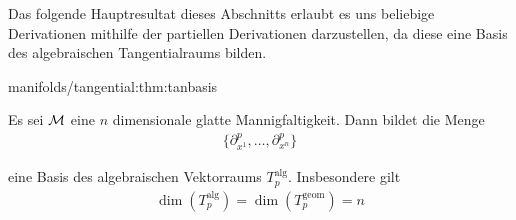 \par
Das folgende Hauptresultat dieses Abschnitts erlaubt es uns beliebige Derivationen mithilfe der partiellen Derivationen darzustellen, da diese eine Basis des algebraischen Tangentialraums bilden.
\begin{theorem}{}{manifolds/tangential:thm:tanbasis}



\par
Es sei \(\mathcal{M}\) eine \(n\) dimensionale glatte Mannigfaltigkeit.
Dann bildet die Menge
\begin{align*}
\{\partial_{x^1}^p,\ldots,\partial_{x^n}^p\}
\end{align*}
\par
eine Basis des algebraischen Vektorraums \(T^{\text{alg}}_p\).
Insbesondere gilt
\begin{align*}
\dim(T^{\text{alg}}_p)=\dim(T^{\text{geom}}_p)=n
\end{align*}\end{theorem}

